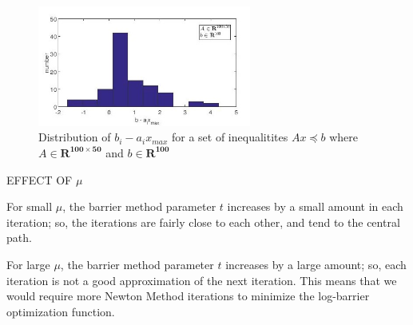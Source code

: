   \begin{figure}[ht]
  \centering
\includegraphics[width=7cm]{source/prob4/fig1}
\caption{Distribution of $b_{i} - a_{i} x_{max}$ for a set of inequalitites $A x \preccurlyeq b$ where $A \in \mathbf{R^{100 \times 50}}$ and $ b \in \mathbf{R^{100}}$}
\end{figure}

EFFECT OF $\mu$

For small $\mu$, the barrier method parameter $t$ increases by a small amount in each iteration; so, the iterations are fairly close to each other, and tend to the central path.

For large $\mu$, the barrier method parameter $t$ increases by a large amount; so, each iteration is not a good approximation of the next iteration. This means that we would require more Newton Method iterations to minimize the log-barrier optimization function.